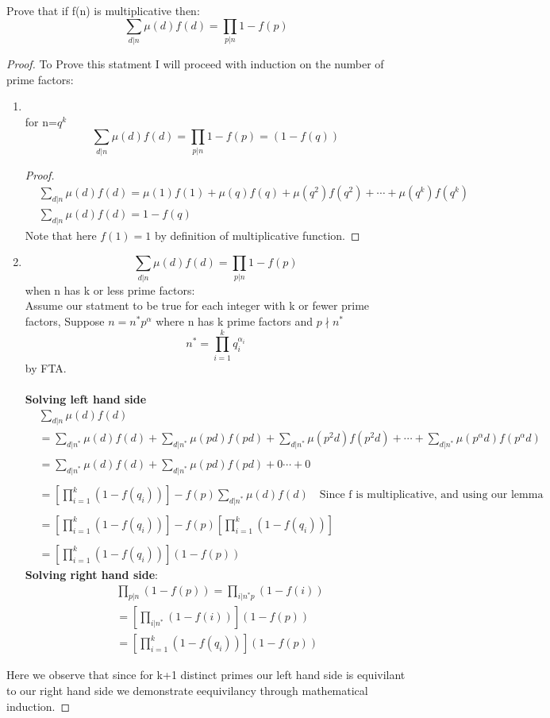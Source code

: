 \documentclass[11pt]{article}
\theoremstyle{definition}  %
\newcommand{\block}[2]{\begin{tcolorbox}[title={#1}]{#2}\end{tcolorbox}}
\begin{document}
\block{Question 6.4.2}{ Prove that if f(n) is multiplicative then:
\[
  \sum_{d|n}\mu(d)f(d)=\prod_{p|n}{1-f(p)}
\]}
\begin{proof}
To Prove this statment I will proceed with induction on the number of prime factors: \\
\begin{enumerate}
  \item \block{\textbf{Base case:}:}{\\
  for n=$q^k$
  \[
    \sum_{d|n}\mu(d)f(d)=\prod_{p|n}{1-f(p)}=(1-f(q))
  \]
  \begin{proof}
    \begin{align*}
      &\sum_{d|n}\mu(d)f(d)=\mu(1)f(1)+\mu(q)f(q)+\mu(q^2)f(q^2)+\cdots+\mu(q^k)f(q^k)\\
      &\sum_{d|n}\mu(d)f(d)=1-f(q)
    \end{align*}
  Note that here $f(1)=1$ by definition of multiplicative function.
\end{proof}}
\item\block{ \textbf{Inductive Step:}}{
  \[
    \sum_{d|n}\mu(d)f(d)=\prod_{p|n}{1-f(p)}
  \]
  when n has k or less prime factors: \\

   Assume our statment to be true for each integer with k or fewer prime factors, Suppose $n=n^*p^{\alpha}$ where n has k prime factors and $p\nmid n^*$\\
   \[
     n^*=\prod_{i=1}^kq_i^{\alpha_i}
   \]
   by FTA.\\\\
   \textbf{Solving left hand side}
   \begin{align*}
     &\sum_{d|n}\mu(d)f(d)\\
     &=\sum_{d|n^*}\mu(d)f(d)+\sum_{d|n^*}\mu(pd)f(pd)+\sum_{d|n^*}\mu(p^2d)f(p^2d)+\cdots +\sum_{d|n^*}\mu(p^{\alpha}d)f(p^{\alpha}d)\\\\
     &=\sum_{d|n^*}\mu(d)f(d)+\sum_{d|n^*}\mu(pd)f(pd)+0\cdots+0\\\\
     &=\left[\prod_{i=1}^k(1-f(q_i))\right]-f(p)\sum_{d|n^*}\mu(d)f(d) \quad \text{Since f is multiplicative, and using our lemma  }\\\\
     &=\left[\prod_{i=1}^k(1-f(q_i))\right]-f(p)\left[\prod_{i=1}^k(1-f(q_i))\right]\\\\
     &=\left[\prod_{i=1}^k(1-f(q_i))\right](1-f(p))
   \end{align*}
    \textbf{Solving right hand side}:\\
    \begin{align*}
      &\prod_{p|n}(1-f(p))=\prod_{i|n^*p}(1-f(i))\\
      &=\left[\prod_{i|n^*}(1-f(i))\right](1-f(p))\\
      &=\left[\prod_{i=1}^k(1-f(q_i))\right](1-f(p))
    \end{align*}
    }
\end{enumerate}

Here we observe that since for k+1 distinct primes our left hand side is equivilant to our right hand side we demonstrate eequivilancy through mathematical induction.
\end{proof}

\end{document}
